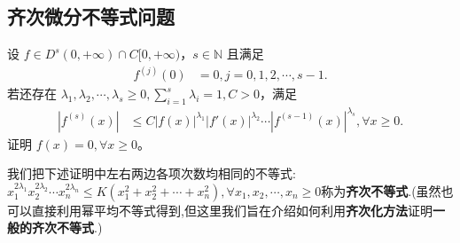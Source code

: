 \documentclass[../../main.tex]{subfiles}
\begin{document}
\subsection{齐次微分不等式问题}

\begin{proposition}\label{proposition:齐次化方法/关于导数乘积不等式问题}
设 $f \in D^s(0,+\infty) \cap C[0,+\infty)$，$s \in \mathbb{N}$ 且满足
\begin{align*}
f^{(j)}(0) &= 0, j = 0, 1, 2, \cdots, s - 1.
\end{align*}
若还存在 $\lambda_1, \lambda_2, \cdots, \lambda_s \geq 0, \sum_{i=1}^{s} \lambda_i = 1, C > 0$，满足
\begin{align}\label{example7.10-0.1}
\left| f^{(s)}(x) \right| &\leq C \left| f(x) \right|^{\lambda_1} \left| f'(x) \right|^{\lambda_2} \cdots \left| f^{(s-1)}(x) \right|^{\lambda_s}, \forall x \geq 0.
\end{align}
证明 $f(x) = 0, \forall x \geq 0$。
\end{proposition}
\begin{note}
我们把下述证明中左右两边各项次数均相同的不等式:$x_{1}^{2\lambda _1}x_{2}^{2\lambda _2}\cdots x_{n}^{2\lambda _n}\leqslant K\left( x_{1}^{2}+x_{2}^{2}+\cdots +x_{n}^{2} \right) ,\forall x_1,x_2,\cdots ,x_n\geqslant 0$称为\textbf{齐次不等式}.(虽然也可以直接利用幂平均不等式得到,但这里我们旨在介绍如何利用\textbf{齐次化方法}证明\textbf{一般的齐次不等式}.)
\end{note}
\end{document}
